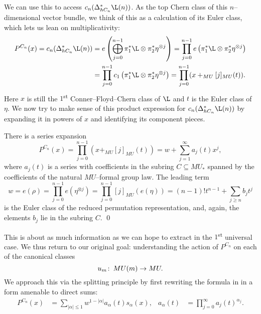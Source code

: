 We can use this to access \(c_n(\Delta_{hC_n}^* \L(n))\).  As the top Chern class of this \(n\)--dimensional vector bundle, we think of this as a calculation of its Euler class, which lets us lean on multiplicativity:
\begin{align*}
P^{C_n}(x) = c_n(\Delta_{hC_n}^* \L(n)) & = e\left( \bigoplus_{j=0}^{n-1} \pi_1^* \L \otimes \pi_2^* \eta^{\otimes j} \right)
= \prod_{j=0}^{n-1} e\left( \pi_1^* \L \otimes \pi_2^* \eta^{\otimes j} \right) \\
& = \prod_{j=0}^{n-1} c_1\left( \pi_1^* \L \otimes \pi_2^* \eta^{\otimes j} \right)
= \prod_{j=0}^{n-1} (x +_{MU} [j]_{MU}(t)).
\end{align*}
Here \(x\) is still the \(1\)\textsuperscript{st} Conner--Floyd--Chern class of \(\L\) and \(t\) is the Euler class of \(\eta\).  We now try to make sense of this product expression for \(c_n(\Delta_{hC_n}^* \L(n))\) by expanding it in powers of \(x\) and identifying its component pieces.
\begin{lemma}\label{AjAndBjAreInTheFGLSubring}
There is a series expansion \[P^{C_n}(x) = \prod_{j=0}^{n-1} (x +_{MU} [j]_{MU}(t)) = w + \sum_{j=1}^\infty a_j(t) x^j,\] where \(a_j(t)\) is a series with coefficients in the subring \(C \subseteq MU_*\) spanned by the coefficients of the natural \(MU\)--formal group law.  The leading term \[w = e(\rho) = \prod_{j=0}^{n-1} e(\eta^{\otimes j}) = \prod_{j=0}^{n-1} [j]_{MU} (e(\eta)) = (n-1)! t^{n-1} + \sum_{j \ge n} b_j t^j\] is the Euler class of the reduced permutation representation, and, again, the elements \(b_j\) lie in the subring \(C\). \qed
\end{lemma}

This is about as much information as we can hope to extract in the \(1\)\textsuperscript{st} universal case.  We thus return to our original goal: understanding the action of \(P^{C_n}\) on each of the canonical classes \[u_m\colon\thinspace MU(m) \to MU.\]  We approach this via the splitting principle by first rewriting the formula in  in a form amenable to direct sums:
\begin{align*}
P^{C_n}(x) & = \sum_{|\alpha| \le 1} w^{1 - |\alpha|} a_\alpha(t) s_\alpha(x), &
a_\alpha(t) & = \prod_{j=0}^\infty a_j(t)^{\alpha_j}.
\end{align*}

